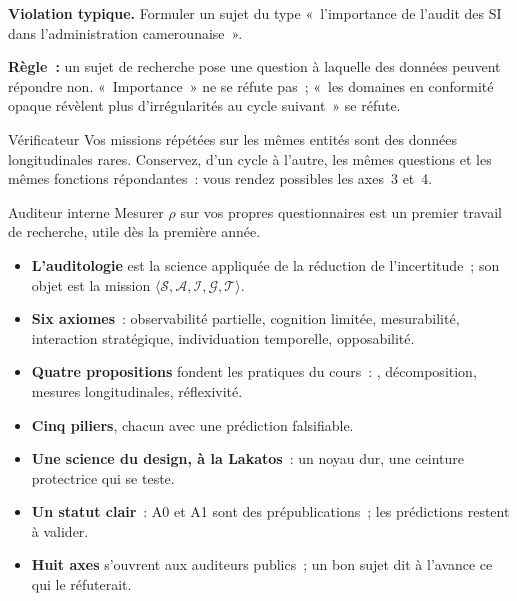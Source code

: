 \begin{boxalert}
\textbf{Violation typique.} Formuler un sujet du type «~l'importance de
l'audit des SI dans l'administration camerounaise~».

\smallskip
\textbf{Règle~:} un sujet de recherche pose une question à laquelle des
données peuvent répondre non. «~Importance~» ne se réfute pas~; «~les
domaines en conformité opaque révèlent plus d'irrégularités au cycle
suivant~» se réfute.
\end{boxalert}

\begin{boxmetier}{Vérificateur}
Vos missions répétées sur les mêmes entités sont des données longitudinales
rares. Conservez, d'un cycle à l'autre, les mêmes questions et les mêmes
fonctions répondantes~: vous rendez possibles les axes~3 et~4.
\end{boxmetier}

\begin{boxmetier}{Auditeur interne}
Mesurer $\rho$ sur vos propres questionnaires est un premier travail de
recherche, utile dès la première année.
\end{boxmetier}

\separateur

\begin{boxresume}
\begin{itemize}
    \item \textbf{L'auditologie} est la science appliquée de la réduction de
          l'incertitude~; son objet est la mission
          $\langle \mathcal{S}, \mathcal{A}, \mathcal{I}, \mathcal{G},
          \mathcal{T} \rangle$.
    \item \textbf{Six axiomes}~: observabilité partielle, cognition limitée,
          mesurabilité, interaction stratégique, individuation temporelle,
          opposabilité.
    \item \textbf{Quatre propositions} fondent les pratiques du cours~:
          \NEK{}, décomposition, mesures longitudinales, réflexivité.
    \item \textbf{Cinq piliers}, chacun avec une prédiction falsifiable.
    \item \textbf{Une science du design, à la Lakatos}~: un noyau dur, une
          ceinture protectrice qui se teste.
    \item \textbf{Un statut clair}~: A0 et A1 sont des prépublications~; les
          prédictions restent à valider.
    \item \textbf{Huit axes} s'ouvrent aux auditeurs publics~; un bon sujet
          dit à l'avance ce qui le réfuterait.
\end{itemize}
\end{boxresume}

